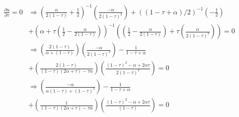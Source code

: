 \documentclass[11pt]{article} %
\begin{document}
\begin{align*}
\frac{\partial u}{\partial \tau} = 0 &\Rightarrow \left(\frac{\alpha}{2(1-\tau)} + \frac{1}{2}\right)^{-1}\left(\frac{-\alpha}{2(1-\tau)^2} \right) + \left( (1-\tau + \alpha)/2\right) ^{-1}\left( -\frac{1}{2} \right) \\&+ \left(\alpha + \tau\left(\frac{1}{2}- \frac{\alpha}{2(1-\tau)} \right)\right)^{-1}\left(\left(\frac{1}{2}- \frac{\alpha}{2(1-\tau)} \right) +\tau\left( \frac{\alpha}{2(1-\tau)^2}\right) \right) = 0 \\
&\Rightarrow \left(\frac{2(1-\tau)}{\alpha+(1-\tau)}\right)\left(\frac{-\alpha}{2(1-\tau)^2} \right) - \frac{1}{1-\tau+\alpha} \\&+ \left(\frac{2(1-\tau)}{(1-\tau)(2\alpha+\tau) - \tau\alpha}\right)\left(\frac{(1-\tau)^2 - \alpha + 2\alpha \tau}{2(1-\tau)^2} \right) = 0 \\
&\Rightarrow \left(\frac{-\alpha}{\alpha(1-\tau)+(1-\tau)^2}\right) - \frac{1}{1-\tau+\alpha} \\&+ \left(\frac{1}{(1-\tau)(2\alpha+\tau) - \tau\alpha}\right)\left(\frac{(1-\tau)^2 - \alpha + 2\alpha \tau}{(1-\tau)} \right) = 0 \\
\end{align*}


%
\end{document}
